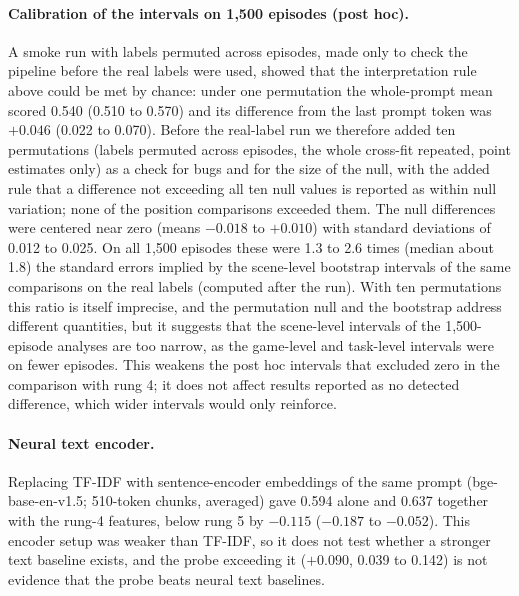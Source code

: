 \documentclass[11pt]{article}
\begin{document}
\paragraph{Calibration of the intervals on 1,500 episodes (post hoc).} A smoke run with labels permuted across episodes, made only to check the pipeline before the real labels were used, showed that the interpretation rule above could be met by chance: under one permutation the whole-prompt mean scored 0.540 (0.510 to 0.570) and its difference from the last prompt token was $+0.046$ (0.022 to 0.070). Before the real-label run we therefore added ten permutations (labels permuted across episodes, the whole cross-fit repeated, point estimates only) as a check for bugs and for the size of the null, with the added rule that a difference not exceeding all ten null values is reported as within null variation; none of the position comparisons exceeded them. The null differences were centered near zero (means $-0.018$ to $+0.010$) with standard deviations of 0.012 to 0.025. On all 1,500 episodes these were 1.3 to 2.6 times (median about 1.8) the standard errors implied by the scene-level bootstrap intervals of the same comparisons on the real labels (computed after the run). With ten permutations this ratio is itself imprecise, and the permutation null and the bootstrap address different quantities, but it suggests that the scene-level intervals of the 1,500-episode analyses are too narrow, as the game-level and task-level intervals were on fewer episodes. This weakens the post hoc intervals that excluded zero in the comparison with rung 4; it does not affect results reported as no detected difference, which wider intervals would only reinforce.

\paragraph{Neural text encoder.} Replacing TF-IDF with sentence-encoder embeddings of the same prompt (bge-base-en-v1.5; 510-token chunks, averaged) gave 0.594 alone and 0.637 together with the rung-4 features, below rung 5 by $-0.115$ ($-0.187$ to $-0.052$). This encoder setup was weaker than TF-IDF, so it does not test whether a stronger text baseline exists, and the probe exceeding it ($+0.090$, 0.039 to 0.142) is not evidence that the probe beats neural text baselines.
\end{document}
